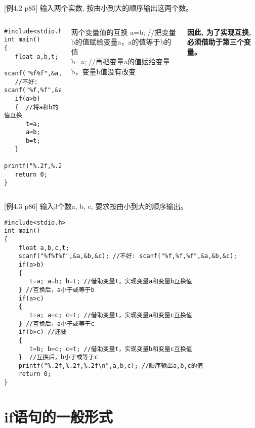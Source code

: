 \begin{frame}
\small [例4.2 p85] 输入两个实数, 按由小到大的顺序输出这两个数。
\begin{columns}
\begin{lstlisting}
#include<stdio.h>        
int main()                   
{  
   float a,b,t;
   scanf("%f%f",&a,&b); 
   //不好: scanf("%f,%f",&a,&b);
   if(a>b)
   {  //将a和b的值互换
      t=a;
      a=b;
      b=t;
   }
   printf("%.2f,%.2f\n",a,b);
   return 0;           
}
\end{lstlisting} 
\small
\begin{block}{两个变量值的互换}
a=b;  //把变量b的值赋给变量a，a的值等于b的值\\
b=a;  //再把变量a的值赋给变量b，变量b值没有改变
\end{block}
\textbf{因此, 为了实现互换, 必须借助于第三个变量。}
\end{columns}                           
\end{frame}

\begin{frame}
\small [例4.3 p86] 输入3个数a, b, c, 要求按由小到大的顺序输出。
\begin{lstlisting}
#include<stdio.h>        
int main()                   
{  
    float a,b,c,t;
    scanf("%f%f%f",&a,&b,&c); //不好: scanf("%f,%f,%f",&a,&b,&c);
    if(a>b)
    {
       t=a; a=b; b=t; //借助变量t，实现变量a和变量b互换值
    } //互换后，a小于或等于b     
    if(a>c)
    {
       t=a; a=c; c=t; //借助变量t，实现变量a和变量c互换值
    } //互换后，a小于或等于c       
    if(b>c) //还要
    { 
       t=b; b=c; c=t; //借助变量t，实现变量b和变量c互换值
    }  //互换后，b小于或等于c                       
    printf("%.2f,%.2f,%.2f\n",a,b,c); //顺序输出a,b,c的值
    return 0;  
}
\end{lstlisting}                   
\end{frame}

\section{if语句的一般形式}

